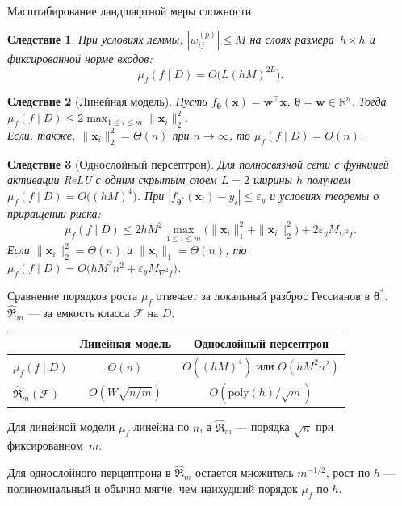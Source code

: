 \documentclass[10pt,pdf,hyperref={unicode}]{beamer}
\newtheorem{ruscorollary}{Следствие}
\begin{document}
\begin{frame}{Масштабирование ландшафтной меры сложности}
\justifying
\begin{ruscorollary}
При условиях леммы, $|w_{ij}^{(p)}|\le M$ на слоях размера~$h\times h$ и фиксированной норме входов:
\[
\mu_f(f\mid D)=O\!\bigl(L(hM)^{2L}\bigr).
\]
\end{ruscorollary}

\begin{ruscorollary}[Линейная модель]
Пусть $f_{\boldsymbol{\theta}}(\mathbf{x})=\mathbf{w}^{\top}\mathbf{x}$, $\boldsymbol{\theta}=\mathbf{w}\in\mathbb{R}^n$. Тогда
$\mu_f(f\mid D)\le 2\max_{1\le i\le m}\|\mathbf{x}_i\|_2^2.$
~\\
Если, также, $\|\mathbf{x}_i\|_2^2=\Theta(n)$ при $n\to\infty$, то $\mu_f(f\mid D)=O(n)$.
\end{ruscorollary}

\begin{ruscorollary}[Однослойный персептрон]
Для полносвязной сети с функцией активации ReLU с одним скрытым слоем $L=2$ ширины $h$ получаем
$\mu_f(f\mid D)=O\!\bigl((hM)^4\bigr)$.
При $|f_{\boldsymbol{\theta}^*}(\mathbf{x}_i)-y_i|\le\varepsilon_y$ и условиях теоремы о приращении риска:
\[
\mu_f(f\mid D)
\le 2hM^2\max_{1\le i\le m}\bigl(\|\mathbf{x}_i\|_1^2+\|\mathbf{x}_i\|_2^2\bigr)
+2\varepsilon_y M_{\nabla^2 f}.
\]
Если $\|\mathbf{x}_i\|_2^2=\Theta(n)$ и $\|\mathbf{x}_i\|_1=\Theta(n)$, то
$\mu_f(f\mid D)=O\!\bigl(hM^2n^2+\varepsilon_y M_{\nabla^2 f}\bigr)$.
\end{ruscorollary}
\end{frame}

\begin{frame}{Сравнение порядков роста}
\justifying
$\mu_f$ отвечает за локальный разброс Гессианов в $\boldsymbol{\theta}^*$.
~\\
$\hat{\mathfrak{R}}_m$ --- за емкость класса $\mathcal{F}$ на $D$.

\begin{table}
\centering
\setlength{\tabcolsep}{6pt}
\begin{tabular}{@{}lcc@{}}
\toprule
 & Линейная модель & Однослойный персептрон \\
\midrule
$\mu_f(f\mid D)$ & $O(n)$ & $O((hM)^4)$ или $O(hM^2n^2)$ \\
\addlinespace[0.2em]
$\hat{\mathfrak{R}}_m(\mathcal{F})$ &
$O(W\sqrt{n/m})$ &
$O(\mathrm{poly}(h)/\sqrt{m})$ \\
\bottomrule
\end{tabular}
\end{table}

Для линейной модели $\mu_f$ линейна по $n$, а $\hat{\mathfrak{R}}_m$ --- порядка $\sqrt{n}$ при фиксированном~$m$.

Для однослойного перцептрона в $\hat{\mathfrak{R}}_m$ остается множитель $m^{-1/2}$, рост по $h$ --- полиномиальный и обычно мягче, чем наихудший порядок $\mu_f$ по $h$.
\end{frame}
\end{document}
